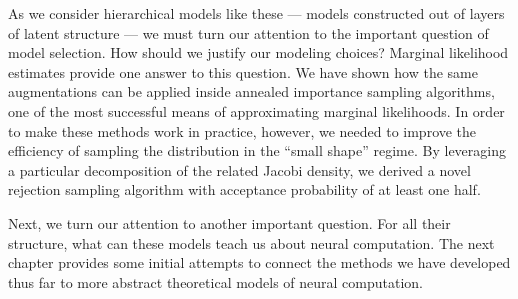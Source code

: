 As we consider hierarchical models like these --- models constructed out of
layers of latent structure --- we must turn our attention to the
important question of model selection. How should we justify our
modeling choices? Marginal likelihood estimates provide one answer
to this question. We have shown how the same \polyagamma augmentations
can be applied inside annealed importance sampling algorithms,
one of the most successful means of approximating marginal likelihoods.
In order to make these methods work in practice, however, we needed to
improve the efficiency of sampling the \polyagamma distribution in the
``small shape'' regime. By leveraging a particular decomposition of the
related Jacobi density, we derived a novel rejection sampling algorithm
with acceptance probability of at least one half.

Next, we turn our attention
to another important question. For all their structure, what can these
models teach us about neural computation. The next chapter provides some
initial attempts to connect the methods we have developed thus far to more
abstract theoretical models of neural computation. 

